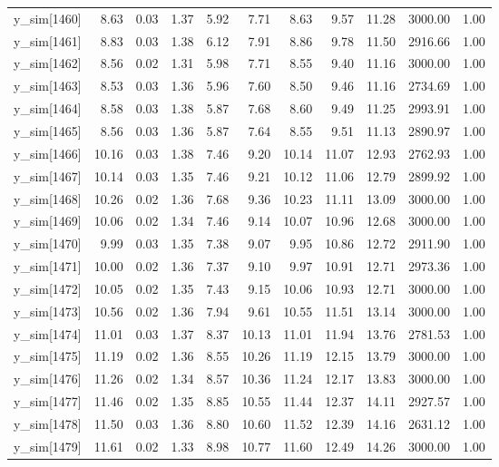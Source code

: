 \begin{table}[ht]
\begin{tabular}{rrrrrrrrrrr}
  y\_sim[1460] & 8.63 & 0.03 & 1.37 & 5.92 & 7.71 & 8.63 & 9.57 & 11.28 & 3000.00 & 1.00 \\ 
  y\_sim[1461] & 8.83 & 0.03 & 1.38 & 6.12 & 7.91 & 8.86 & 9.78 & 11.50 & 2916.66 & 1.00 \\ 
  y\_sim[1462] & 8.56 & 0.02 & 1.31 & 5.98 & 7.71 & 8.55 & 9.40 & 11.16 & 3000.00 & 1.00 \\ 
  y\_sim[1463] & 8.53 & 0.03 & 1.36 & 5.96 & 7.60 & 8.50 & 9.46 & 11.16 & 2734.69 & 1.00 \\ 
  y\_sim[1464] & 8.58 & 0.03 & 1.38 & 5.87 & 7.68 & 8.60 & 9.49 & 11.25 & 2993.91 & 1.00 \\ 
  y\_sim[1465] & 8.56 & 0.03 & 1.36 & 5.87 & 7.64 & 8.55 & 9.51 & 11.13 & 2890.97 & 1.00 \\ 
  y\_sim[1466] & 10.16 & 0.03 & 1.38 & 7.46 & 9.20 & 10.14 & 11.07 & 12.93 & 2762.93 & 1.00 \\ 
  y\_sim[1467] & 10.14 & 0.03 & 1.35 & 7.46 & 9.21 & 10.12 & 11.06 & 12.79 & 2899.92 & 1.00 \\ 
  y\_sim[1468] & 10.26 & 0.02 & 1.36 & 7.68 & 9.36 & 10.23 & 11.11 & 13.09 & 3000.00 & 1.00 \\ 
  y\_sim[1469] & 10.06 & 0.02 & 1.34 & 7.46 & 9.14 & 10.07 & 10.96 & 12.68 & 3000.00 & 1.00 \\ 
  y\_sim[1470] & 9.99 & 0.03 & 1.35 & 7.38 & 9.07 & 9.95 & 10.86 & 12.72 & 2911.90 & 1.00 \\ 
  y\_sim[1471] & 10.00 & 0.02 & 1.36 & 7.37 & 9.10 & 9.97 & 10.91 & 12.71 & 2973.36 & 1.00 \\ 
  y\_sim[1472] & 10.05 & 0.02 & 1.35 & 7.43 & 9.15 & 10.06 & 10.93 & 12.71 & 3000.00 & 1.00 \\ 
  y\_sim[1473] & 10.56 & 0.02 & 1.36 & 7.94 & 9.61 & 10.55 & 11.51 & 13.14 & 3000.00 & 1.00 \\ 
  y\_sim[1474] & 11.01 & 0.03 & 1.37 & 8.37 & 10.13 & 11.01 & 11.94 & 13.76 & 2781.53 & 1.00 \\ 
  y\_sim[1475] & 11.19 & 0.02 & 1.36 & 8.55 & 10.26 & 11.19 & 12.15 & 13.79 & 3000.00 & 1.00 \\ 
  y\_sim[1476] & 11.26 & 0.02 & 1.34 & 8.57 & 10.36 & 11.24 & 12.17 & 13.83 & 3000.00 & 1.00 \\ 
  y\_sim[1477] & 11.46 & 0.02 & 1.35 & 8.85 & 10.55 & 11.44 & 12.37 & 14.11 & 2927.57 & 1.00 \\ 
  y\_sim[1478] & 11.50 & 0.03 & 1.36 & 8.80 & 10.60 & 11.52 & 12.39 & 14.16 & 2631.12 & 1.00 \\ 
  y\_sim[1479] & 11.61 & 0.02 & 1.33 & 8.98 & 10.77 & 11.60 & 12.49 & 14.26 & 3000.00 & 1.00 \\ 

\end{tabular}
\end{table}
